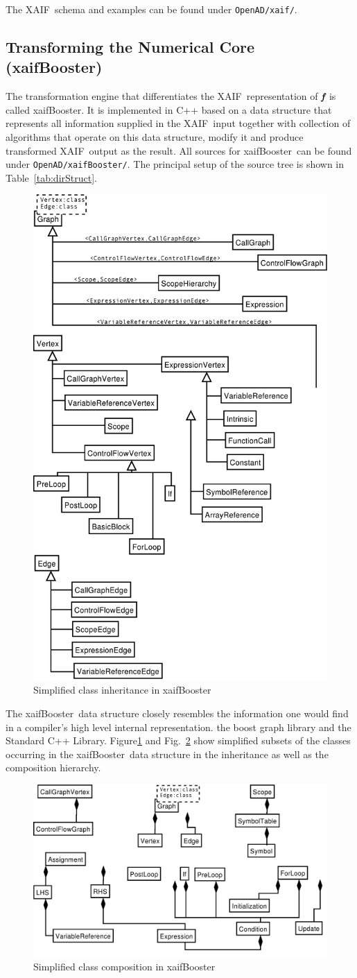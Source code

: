 \documentclass{book}
\newcommand{\xaif}{XAIF}
\newcommand{\xaifBooster}{xaifBooster}
\newcommand{\bmf}{\mbox{\bf\em f}}
\newcommand{\reffig}[1]{{Fig.~\ref{#1}}}
\newcommand{\reffigBS}[1]{{Figure\ref{#1}}}
\newcommand{\reftab}[1]{{Table~\ref{#1}}}
\begin{document}
The \xaif\ schema and examples can be found under \lstinline{OpenAD/xaif/}.

\subsection{Transforming the Numerical Core (\xaifBooster)} \label{sec:xaifBooster}
The transformation engine that differentiates the \xaif\ representation of 
$\bmf$ is called \xaifBooster. It is implemented in C++ based on a 
data structure that represents all information supplied in the \xaif\ input 
together with collection of algorithms that operate on this data structure, modify 
it and produce transformed \xaif\ output as the result. All sources for \xaifBooster\ can be found under \lstinline{OpenAD/xaifBooster/}. The principal setup of the source tree is shown in \reftab{tab:dirStruct}.
\begin{figure}
  \centering \includegraphics[width=.45\textwidth]{irInh}
  \caption{Simplified class inheritance in \xaifBooster} \label{fig:iri}
\end{figure}
The \xaifBooster\ data structure  
closely resembles the information one would find in a 
compiler's high level internal representation. 
the boost graph library \cite{boostWeb}
and the Standard C++ Library\cite{libstdcWeb}.
\reffigBS{fig:iri} and \reffig{fig:irc} show simplified subsets of the classes 
occurring in the \xaifBooster\ data structure in the inheritance 
as well as the composition hierarchy.  
\begin{figure}[htb]
  \centering \includegraphics[width=.45\textwidth]{irComp}
  \caption{Simplified class composition in \xaifBooster} \label{fig:irc}
\end{figure}
\end{document}

